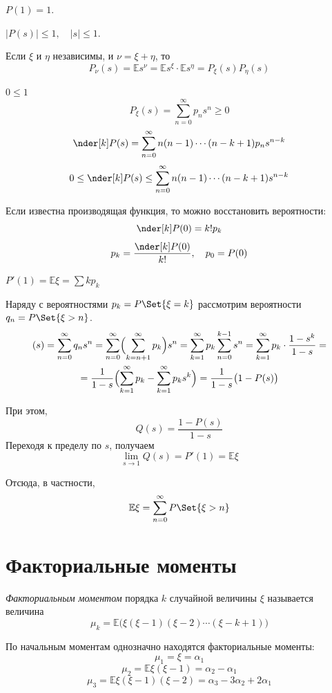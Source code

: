 \begin{props}
\item $ P(1) = 1 $.
\item $ |P(s)| \le 1, \quad |s| \le 1 $.
\item Если $ \xi $ и $ \eta $ независимы, и $ \nu = \xi + \eta $, то
	$$ P_\nu(s) = \mathbb Es^\nu = \mathbb E s^\xi \cdot \mathbb E s^\eta = P_\xi(s)P_\eta(s) $$
\item $ 0 \le 1 $
	$$ P_\xi(s) = \sum_{n = 0}^\infty p_ns^n \ge 0 $$
	$$ \nder[k]P(s) = \sum_{n = 0}^\infty n (n - 1) \cdots (n - k + 1)p_ns^{n - k} $$
	$$ 0 \le \nder[k]P(s) \le \sum_{n = 0}^\infty n(n - 1) \cdots (n - k + 1)s^{n - k} $$
\item Если известна производящая функция, то можно восстановить вероятности:
	$$ \nder[k]P(0) = k!p_k $$
	$$ p_k = \frac{\nder[k]P(0)}{k!}, \quad p_0 = P(0) $$
\item $ P'(1) = \mathbb E \xi = \sum k p_k $

	Наряду с вероятностями $ p_k = P\Set{\xi = k} $ рассмотрим вероятности $ q_n = P\Set{\xi > n} $.
	\begin{multline*}
		(s) = \sum_{n = 0}^\infty q_ns^n =
		\sum_{n = 0}^\infty \Bigl( \sum_{k = n + 1}^\infty p_k \Bigr) s^n =
		\sum_{k = 1}^\infty p_k \sum_{n = 0}^{k - 1}s^n =
		\sum_{k = 1}^\infty p_k \cdot \frac{1 - s^k}{1 - s} = \\
		= \frac1{1 - s} \Bigl( \sum_{k = 1}^\infty p_k - \sum_{k = 1}^\infty p_ks^k \Bigr) =
		\frac1{1 - s} \bigl( 1 - P(s) \bigr)
	\end{multline*}

	При этом,
	$$ Q(s) = \frac{1 - P(s)}{1 - s} $$
	Переходя к пределу по $ s $, получаем
	$$ \lim\limits_{s \to 1} Q(s) = P'(1) = \mathbb E \xi $$

	Отсюда, в частности,
	$$ \mathbb E \xi = \sum_{n = 0}^\infty P\Set{\xi > n} $$
\end{props}

\section{Факториальные моменты}

\begin{definition}
	\emph{Факториальным моментом} порядка $ k $ случайной величины $ \xi $ называется величина
	$$ \mu_k = \mathbb E \bigl( \xi (\xi - 1)(\xi - 2) \cdots (\xi - k + 1) \bigr) $$	
\end{definition}

По начальным моментам однозначно находятся факториальные моменты:
$$ \mu_1 = \mathbb \xi = \alpha_1 $$
$$ \mu_2 = \mathbb E \xi (\xi - 1) = \alpha_2 - \alpha_1 $$
$$ \mu_3 = \mathbb E \xi (\xi - 1) (\xi - 2) = \alpha_3 - 3\alpha_2 + 2\alpha_1 $$

